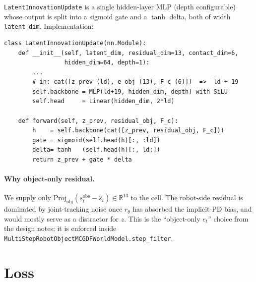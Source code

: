 \documentclass[11pt]{article}
\begin{document}
\texttt{LatentInnovationUpdate} is a single hidden-layer MLP (depth
configurable) whose output is split into a sigmoid gate and a
$\tanh$ delta, both of width \texttt{latent\_dim}.  Implementation:
\begin{lstlisting}
class LatentInnovationUpdate(nn.Module):
    def __init__(self, latent_dim, residual_dim=13, contact_dim=6,
                 hidden_dim=64, depth=1):
        ...
        # in: cat([z_prev (ld), e_obj (13), F_c (6)])  =>  ld + 19
        self.backbone = MLP(ld+19, hidden_dim, depth) with SiLU
        self.head     = Linear(hidden_dim, 2*ld)

    def forward(self, z_prev, residual_obj, F_c):
        h    = self.backbone(cat([z_prev, residual_obj, F_c]))
        gate = sigmoid(self.head(h)[:, :ld])
        delta= tanh   (self.head(h)[:, ld:])
        return z_prev + gate * delta
\end{lstlisting}
\paragraph{Why object-only residual.}  We supply only
$\mathrm{Proj}_{\mathrm{obj}}(s_t^{\mathrm{obs}} - \hat s_t) \in
\mathbb{R}^{13}$ to the cell.  The robot-side residual is dominated
by joint-tracking noise once $r_\theta$ has absorbed the implicit-PD
bias, and would mostly serve as a distractor for $z$.  This is the
``object-only $e_t$'' choice from the design notes; it is enforced
inside \texttt{MultiStepRobotObjectMCGDFWorldModel.step\_filter}.

\section{Loss}
\end{document}
